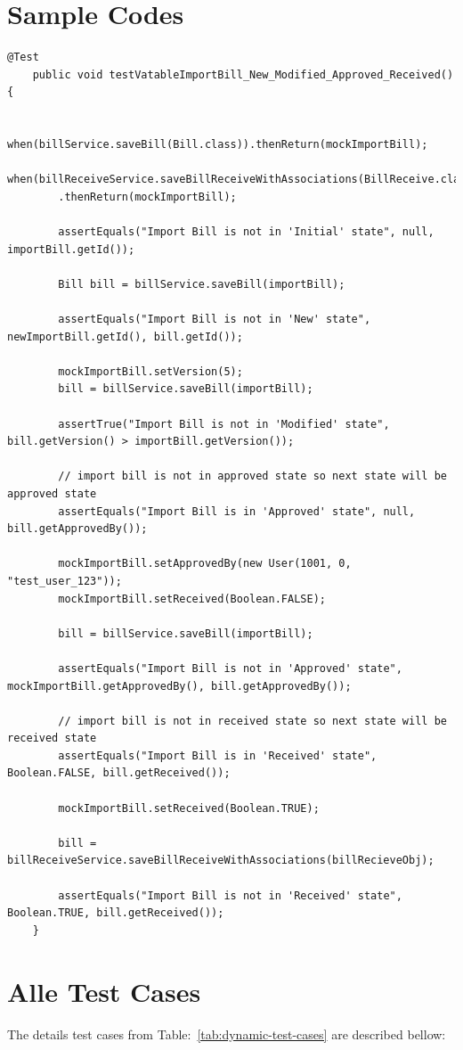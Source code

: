 \documentclass[12pt]{article}
\begin{document}
\section{Sample Codes}
\begin{lstlisting}
@Test
	public void testVatableImportBill_New_Modified_Approved_Received() {
		
		when(billService.saveBill(Bill.class)).thenReturn(mockImportBill);
		when(billReceiveService.saveBillReceiveWithAssociations(BillReceive.class))
        .thenReturn(mockImportBill);	
		
		assertEquals("Import Bill is not in 'Initial' state", null, importBill.getId());
		
		Bill bill = billService.saveBill(importBill);

		assertEquals("Import Bill is not in 'New' state", newImportBill.getId(), bill.getId());

		mockImportBill.setVersion(5);
		bill = billService.saveBill(importBill);

		assertTrue("Import Bill is not in 'Modified' state", bill.getVersion() > importBill.getVersion());
		
		// import bill is not in approved state so next state will be approved state
		assertEquals("Import Bill is in 'Approved' state", null, bill.getApprovedBy());

		mockImportBill.setApprovedBy(new User(1001, 0, "test_user_123"));
		mockImportBill.setReceived(Boolean.FALSE);
		
		bill = billService.saveBill(importBill);
				
		assertEquals("Import Bill is not in 'Approved' state", mockImportBill.getApprovedBy(), bill.getApprovedBy());

		// import bill is not in received state so next state will be received state
		assertEquals("Import Bill is in 'Received' state", Boolean.FALSE, bill.getReceived());
		
		mockImportBill.setReceived(Boolean.TRUE);
		
		bill = billReceiveService.saveBillReceiveWithAssociations(billRecieveObj);

		assertEquals("Import Bill is not in 'Received' state", Boolean.TRUE, bill.getReceived());
	}
\end{lstlisting}

\section{Alle Test Cases}
The details test cases from Table:~\ref{tab:dynamic-test-cases} are described bellow:
\end{document}
